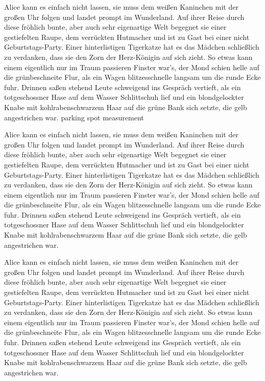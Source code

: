 Alice kann es einfach nicht lassen, sie muss dem weißen Kaninchen mit der großen Uhr folgen und landet prompt im Wunderland. Auf ihrer Reise durch diese fröhlich bunte, aber auch sehr eigenartige Welt begegnet sie einer gestiefelten Raupe, dem verrückten Hutmacher und ist zu Gast bei einer nicht Geburtstags-Party. Einer hinterlistigen Tigerkatze hat es das Mädchen schließlich zu verdanken, dass sie den Zorn der Herz-Königin auf sich zieht. So etwas kann einem eigentlich nur im Traum passieren
Finster war's, der Mond schien helle auf die grünbeschneite Flur, als
ein Wagen blitzesschnelle langsam um die runde Ecke fuhr. Drinnen
saßen stehend Leute schweigend ins Gespräch vertieft, als ein
totgeschossner Hase auf dem Wasser Schlittschuh lief und ein
blondgelockter Knabe mit kohlrabenschwarzem Haar auf die grüne Bank
sich setzte, die gelb angestrichen war.
\Gls{parking spot measurement}

Alice kann es einfach nicht lassen, sie muss dem weißen Kaninchen mit der großen Uhr folgen und landet prompt im Wunderland. Auf ihrer Reise durch diese fröhlich bunte, aber auch sehr eigenartige Welt begegnet sie einer gestiefelten Raupe, dem verrückten Hutmacher und ist zu Gast bei einer nicht Geburtstags-Party. Einer hinterlistigen Tigerkatze hat es das Mädchen schließlich zu verdanken, dass sie den Zorn der Herz-Königin auf sich zieht. So etwas kann einem eigentlich nur im Traum passieren
Finster war's, der Mond schien helle auf die grünbeschneite Flur, als
ein Wagen blitzesschnelle langsam um die runde Ecke fuhr. Drinnen
saßen stehend Leute schweigend ins Gespräch vertieft, als ein
totgeschossner Hase auf dem Wasser Schlittschuh lief und ein
blondgelockter Knabe mit kohlrabenschwarzem Haar auf die grüne Bank
sich setzte, die gelb angestrichen war.

Alice kann es einfach nicht lassen, sie muss dem weißen Kaninchen mit der großen Uhr folgen und landet prompt im Wunderland. Auf ihrer Reise durch diese fröhlich bunte, aber auch sehr eigenartige Welt begegnet sie einer gestiefelten Raupe, dem verrückten Hutmacher und ist zu Gast bei einer nicht Geburtstags-Party. Einer hinterlistigen Tigerkatze hat es das Mädchen schließlich zu verdanken, dass sie den Zorn der Herz-Königin auf sich zieht. So etwas kann einem eigentlich nur im Traum passieren
Finster war's, der Mond schien helle auf die grünbeschneite Flur, als
ein Wagen blitzesschnelle langsam um die runde Ecke fuhr. Drinnen
saßen stehend Leute schweigend ins Gespräch vertieft, als ein
totgeschossner Hase auf dem Wasser Schlittschuh lief und ein
blondgelockter Knabe mit kohlrabenschwarzem Haar auf die grüne Bank
sich setzte, die gelb angestrichen war.

